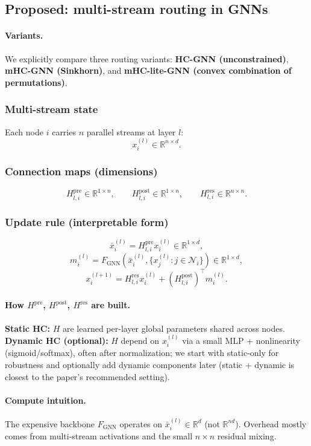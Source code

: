 \documentclass[11pt]{article}
\begin{document}
\subsection{Proposed: multi-stream routing in GNNs}
\paragraph{Variants.}
We explicitly compare three routing variants: \textbf{HC-GNN (unconstrained)}, \textbf{mHC-GNN (Sinkhorn)}, and \textbf{mHC-lite-GNN (convex combination of permutations)}.

\subsubsection{Multi-stream state}
Each node $i$ carries $n$ parallel streams at layer $l$:
\[
x_i^{(l)}\in\mathbb{R}^{n\times d}.
\]

\subsubsection{Connection maps (dimensions)}
\[
H^{\mathrm{pre}}_{l,i}\in\mathbb{R}^{1\times n},\qquad
H^{\mathrm{post}}_{l,i}\in\mathbb{R}^{1\times n},\qquad
H^{\mathrm{res}}_{l,i}\in\mathbb{R}^{n\times n}.
\]

\subsubsection{Update rule (interpretable form)}
\[
\bar x_i^{(l)}=H^{\mathrm{pre}}_{l,i}x_i^{(l)}\in\mathbb{R}^{1\times d},
\]
\[
m_i^{(l)}=F_{\mathrm{GNN}}\!\left(\bar x_i^{(l)},\{x_j^{(l)}:j\in\mathcal{N}_i\}\right)\in\mathbb{R}^{1\times d},
\]
\[
x_i^{(l+1)}=H^{\mathrm{res}}_{l,i}x_i^{(l)}+(H^{\mathrm{post}}_{l,i})^\top m_i^{(l)}.
\]

\paragraph{How $H^{\mathrm{pre}}$, $H^{\mathrm{post}}$, $H^{\mathrm{res}}$ are built.}
\textbf{Static HC:} $H$ are learned per-layer global parameters shared across nodes.
\textbf{Dynamic HC (optional):} $H$ depend on $x_i^{(l)}$ via a small MLP + nonlinearity (sigmoid/softmax), often after normalization; we start with static-only for robustness and optionally add dynamic components later (static + dynamic is closest to the paper’s recommended setting).

\paragraph{Compute intuition.}
The expensive backbone $F_{\mathrm{GNN}}$ operates on $\bar x_i^{(l)}\in\mathbb{R}^d$ (not $\mathbb{R}^{nd}$).
Overhead mostly comes from multi-stream activations and the small $n\times n$ residual mixing.
\end{document}
